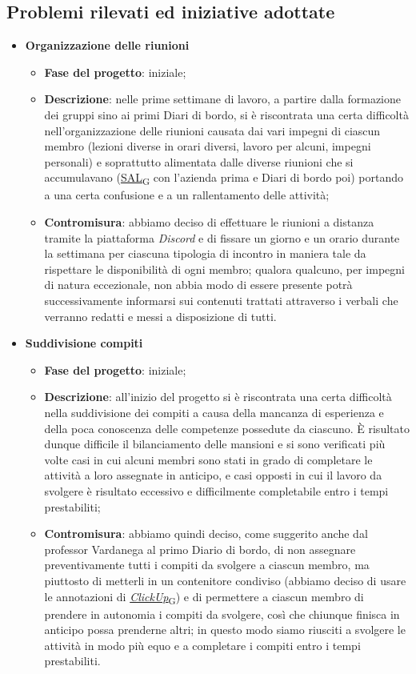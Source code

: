 \subsection{Problemi rilevati ed iniziative adottate}
\begin{itemize}
    \item \textbf{Organizzazione delle riunioni}
    \begin{itemize}
        \item \textbf{Fase del progetto}: iniziale;
        \item \textbf{Descrizione}: nelle prime settimane di lavoro, a partire dalla formazione dei gruppi sino ai primi Diari di bordo, si è riscontrata una certa difficoltà nell'organizzazione delle riunioni causata dai vari impegni di ciascun membro (lezioni diverse in orari diversi, lavoro per alcuni, impegni personali) e soprattutto alimentata dalle diverse riunioni che si accumulavano (\href{https://7last.github.io/docs/rtb/documentazione-interna/glossario\#stato-avanzamento-lavori}{SAL\textsubscript{G}} con l'azienda prima e Diari di bordo poi) portando a una certa confusione e a un rallentamento delle attività;
        \item \textbf{Contromisura}: abbiamo deciso di effettuare le riunioni a distanza tramite la piattaforma \textit{Discord} e di fissare un giorno e un orario durante la settimana per ciascuna tipologia di incontro in maniera tale da rispettare le disponibilità di ogni membro; qualora qualcuno, per impegni di natura eccezionale, non abbia modo di essere presente potrà successivamente informarsi sui contenuti trattati attraverso i verbali che verranno redatti e messi a disposizione di tutti.
    \end{itemize}
    \item \textbf{Suddivisione compiti}
    \begin{itemize}
        \item \textbf{Fase del progetto}: iniziale;
        \item \textbf{Descrizione}: all'inizio del progetto si è riscontrata una certa difficoltà nella suddivisione dei compiti a causa della mancanza di esperienza e della poca conoscenza delle competenze possedute da ciascuno. È risultato dunque difficile il bilanciamento delle mansioni e si sono verificati più volte casi in cui alcuni membri sono stati in grado di completare le attività a loro assegnate in anticipo, e casi opposti in cui il lavoro da svolgere è risultato eccessivo e difficilmente completabile entro i tempi prestabiliti;
        \item \textbf{Contromisura}: abbiamo quindi deciso, come suggerito anche dal professor Vardanega al primo Diario di bordo, di non assegnare preventivamente tutti i compiti da svolgere a ciascun membro, ma piuttosto di metterli in un contenitore condiviso (abbiamo deciso di usare le annotazioni di \href{https://7last.github.io/docs/rtb/documentazione-interna/glossario\#clickup}{\textit{ClickUp}\textsubscript{G}}) e di permettere a ciascun membro di prendere in autonomia i compiti da svolgere, così che chiunque finisca in anticipo possa prenderne altri; in questo modo siamo riusciti a svolgere le attività in modo più equo e a completare i compiti entro i tempi prestabiliti.

\end{itemize}
\end{itemize}
